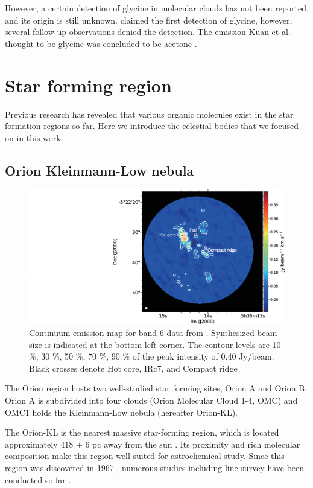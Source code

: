 However, a certain detection of glycine in molecular clouds has not been reported, and
its origin is still unknown.
\citet{Kuan+2003} claimed the first detection of glycine, however, several follow-up observations 
denied the detection.
The emission Kuan et al. thought to be glycine was concluded to be acetone
\citep[e.g.,][]{Jones+2007}.

\newpage
\section{Star forming region}
Previous research has revealed that various organic molecules exist in the star formation regions so far. 
Here we introduce the celestial bodies that we focused on in this work.
\subsection{Orion Kleinmann-Low nebula}
\begin{figure}[ht]
  \hspace{-5cm}
  \includegraphics[width=18cm]{OrionKL/Orion_cnt.eps}
  \caption{Continuum emission map for band 6 data from \citet{Hirota+2015}. Synthesized beam size is indicated at the bottom-left corner. The contour levels are 10 \%, 30 \%, 50 \%, 70 \%, 90 \% of the peak intensity of 0.40 Jy/beam. Black crosses denote Hot core, IRc7, and Compact ridge}
  \label{fig:cont+2015}
  
\end{figure}

The Orion region hosts two well-studied star forming sites, Orion A and Orion B. 
Orion A is subdivided into four clouds (Orion Molecular Cloud 1-4, OMC) and 
OMC1 holds the Kleinmann-Low nebula (hereafter Orion-KL).

The Orion-KL is the nearest massive star-forming region, which is located approximately 
418 $\pm$ 6 pc away from the sun \citep{Kim+2008}. 
Its proximity and rich molecular composition make this region well suited for astrochemical study.
Since this region was discovered in 1967 \citep*{Kleinmann+1967},
numerous studies including line survey have been conducted so far \citep[e.g.,][]{Pagani+2017, Feng+2015, Gong+2015, Turner1991}.

